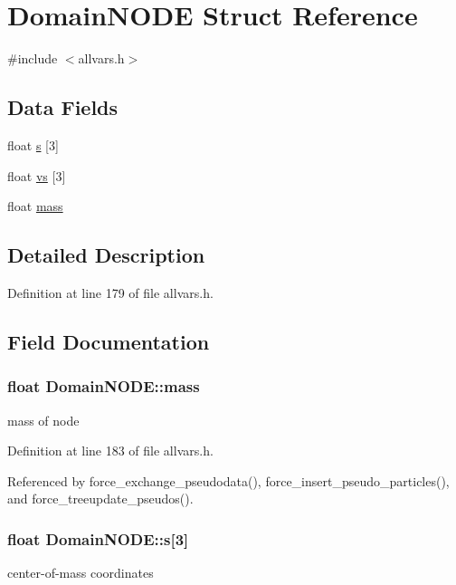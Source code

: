 \hypertarget{structDomainNODE}{
\section{DomainNODE Struct Reference}
\label{structDomainNODE}
}


{\ttfamily \#include $<$allvars.h$>$}

\subsection*{Data Fields}
\begin{DoxyCompactItemize}
\item 
float \hyperlink{structDomainNODE_ae047a14ee5331dc9d6e128cb6c5e95e4}{s} \mbox{[}3\mbox{]}
\item 
float \hyperlink{structDomainNODE_a52c312bfff90fd7236c7d1e176c03d9c}{vs} \mbox{[}3\mbox{]}
\item 
float \hyperlink{structDomainNODE_afb739de9da1eb6908f9064093e02e7bc}{mass}
\end{DoxyCompactItemize}


\subsection{Detailed Description}


Definition at line 179 of file allvars.h.



\subsection{Field Documentation}
\hypertarget{structDomainNODE_afb739de9da1eb6908f9064093e02e7bc}{
\subsubsection[{mass}]{\setlength{\rightskip}{0pt plus 5cm}float {\bf DomainNODE::mass}}}
\label{structDomainNODE_afb739de9da1eb6908f9064093e02e7bc}
mass of node 

Definition at line 183 of file allvars.h.



Referenced by force\_\-exchange\_\-pseudodata(), force\_\-insert\_\-pseudo\_\-particles(), and force\_\-treeupdate\_\-pseudos().

\hypertarget{structDomainNODE_ae047a14ee5331dc9d6e128cb6c5e95e4}{
\subsubsection[{s}]{\setlength{\rightskip}{0pt plus 5cm}float {\bf DomainNODE::s}\mbox{[}3\mbox{]}}}
\label{structDomainNODE_ae047a14ee5331dc9d6e128cb6c5e95e4}
center-\/of-\/mass coordinates 

